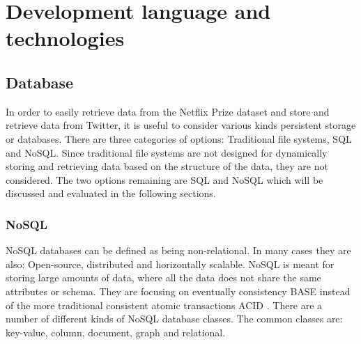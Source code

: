 \section{Development language and technologies}

\subsection{Database}
In order to easily retrieve data from the Netflix Prize dataset and store and retrieve data from Twitter, it is useful to consider various kinds persistent storage or databases. There are three categories of options: Traditional file systems, SQL and NoSQL. Since traditional file systems are not designed for dynamically storing and retrieving data based on the structure of the data, they are not considered. The two options remaining are SQL and NoSQL which will be discussed and evaluated in the following sections.

\subsubsection*{NoSQL}
NoSQL databases can be defined as being non-relational. In many cases they are also: Open-source, distributed and horizontally scalable\cite{nosql}. NoSQL is meant for storing large amounts of data\cite{bigdata}, where all the data does not share the same attributes or schema. They are focusing on eventually consistency BASE instead of the more traditional consistent atomic transactions ACID \cite{pritchett}. There are a number of different kinds of NoSQL database classes. The common classes are: key-value, column, document, graph and relational.


